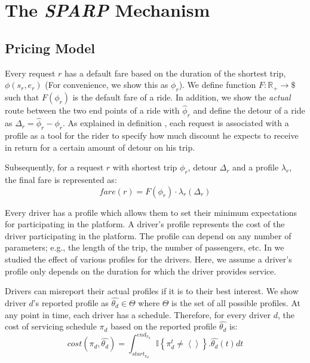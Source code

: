 \section{The \emph{SPARP} Mechanism}
\label{sec:mechanism}

\subsection{Pricing Model}
\label{subsec:pricing}
Every request $r$ has a default fare based on the duration of the shortest trip, $\phi(s_r, e_r)$ (For convenience, we show this as $\phi_r$). We define function $F: \mathbb{R}_{+}  \rightarrow \$ $ such that $F(\phi_r)$ is the default fare of a ride. In addition, we show the \textit{actual} route between the two end points of a ride with $\hat{\phi}_r$ and define the detour of a ride as $\Delta_r = \hat{\phi}_r - \phi_r$. As explained in definition , each request is associated with a profile as a tool for the rider to specify how much discount he expects to receive in return for a certain amount of detour on his trip.

Subsequently, for a request $r$ with shortest trip $\phi_r$, detour $\Delta_r$ and a profile $\lambda_r$, the final fare is represented as:
\begin{equation}
\label{eq:fare}
fare(r) = F(\phi_r) \cdot \lambda_r(\Delta_r)
\end{equation}

Every driver has a profile which allows them to set their minimum expectations for participating in the platform. A driver's profile represents the cost of the driver participating in the platform. The profile can depend on any number of parameters; e.g., the length of the trip, the number of passengers, etc. In \cite{Asghari16} we studied the effect of various profiles for the drivers. Here, we assume a driver's profile only depends on the duration for which the driver provides service. 

Drivers can misreport their actual profiles if it is to their best interest. We show driver $d$'s reported profile as $\hat{\theta_d} \in \Theta$ where $\Theta$ is the set of all possible profiles. At any point in time, each driver has a schedule. Therefore, for every driver $d$, the cost of servicing schedule $\pi_d$ based on the reported profile $\hat{\theta_d}$ is:
\begin{equation}
\label{eq:cost}
cost(\pi_d, \hat{\theta_d}) = \int_{start_{\pi_d}}^{end_{\pi_d}} \mathbb{I}\left\lbrace \pi_d^t \neq \left\langle \right\rangle\right\rbrace.\hat{\theta_d}(t)dt
\end{equation}

